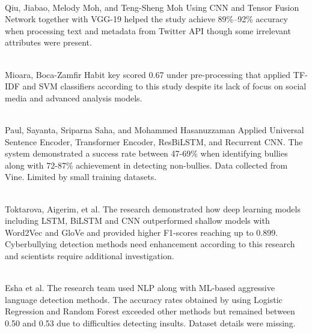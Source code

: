 \documentclass[pdflatex,sn-mathphys-num]{sn-jnl}%
\theoremstyle{thmstyleone}%
\theoremstyle{thmstyletwo}%
\theoremstyle{thmstylethree}%
\begin{document}
\\Qiu, Jiabao, Melody Moh, and Teng-Sheng Moh \cite{bib15}
Using CNN and Tensor Fusion Network together with VGG-19 helped the study achieve 89\%–92\% accuracy when processing text and metadata from Twitter API though some irrelevant attributes were present.

\\Mioara, Boca-Zamfir \cite{bib16}
Habit key scored 0.67 under pre-processing that applied TF-IDF and SVM classifiers according to this study despite its lack of focus on social media and advanced analysis models.

\\Paul, Sayanta, Sriparna Saha, and Mohammed Hasanuzzaman \cite{bib17}
Applied Universal Sentence Encoder, Transformer Encoder, ResBiLSTM, and Recurrent CNN. The system demonstrated a success rate between 47-69\% when identifying bullies along with 72-87\% achievement in detecting non-bullies. Data collected from Vine. Limited by small training datasets.


\\Toktarova, Aigerim, et al. \cite{bib19}
The research demonstrated how deep learning models including LSTM, BiLSTM and CNN outperformed shallow models with Word2Vec and GloVe and provided higher F1-scores reaching up to 0.899. Cyberbullying detection methods need enhancement according to this research and scientists require additional investigation.

\\Esha et al. \cite{bib20}
The research team used NLP along with ML-based aggressive language detection methods. The accuracy rates obtained by using Logistic Regression and Random Forest exceeded other methods but remained between 0.50 and 0.53 due to difficulties detecting insults. Dataset details were missing.
\end{document}
